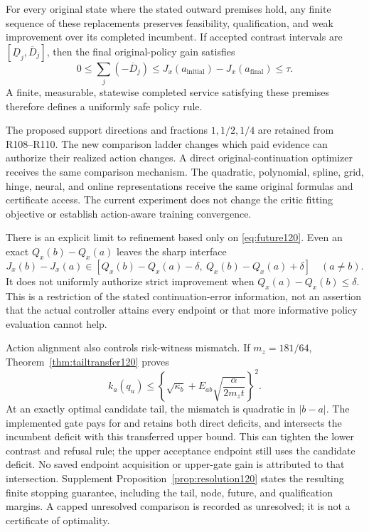 \begin{proposition}
\label{prop:safe120}
For every original state where the stated outward premises hold,
any finite sequence of these replacements preserves feasibility,
qualification, and weak improvement over its completed incumbent.
If accepted contrast intervals are $[\underline D_j,\overline D_j]$,
then the final original-policy gain satisfies
\begin{equation}\label{eq:gainaccount120}
 0\le\sum_j(-\overline D_j)
       \le J_x(a_{\mathrm{initial}})-J_x(a_{\mathrm{final}})
       \le\tau .
\end{equation}
A finite, measurable, statewise completed service satisfying these
premises therefore defines a uniformly safe policy rule.
\end{proposition}

The proposed support directions and fractions $1,1/2,1/4$ are
retained from R108--R110.  The new comparison ladder changes which
paid evidence can authorize their realized action changes.  A direct
original-continuation optimizer receives the same comparison mechanism.
The quadratic, polynomial, spline, grid, hinge, neural, and online
representations receive the same original formulas and certificate
access.  The current experiment does not change the critic fitting
objective or establish action-aware training convergence.

There is an explicit limit to refinement based only on
\eqref{eq:future120}.  Even an exact $Q_x(b)-Q_x(a)$ leaves the
sharp interface
\[
 J_x(b)-J_x(a)\in
 [Q_x(b)-Q_x(a)-\delta,\ Q_x(b)-Q_x(a)+\delta]
 \quad(a\ne b).
\]
It does not uniformly authorize strict improvement when
$Q_x(a)-Q_x(b)\le\delta$.  This is a restriction of the stated
continuation-error information, not an assertion that the actual
controller attains every endpoint or that more informative policy
evaluation cannot help.

Action alignment also controls risk-witness mismatch.  If
$m_z=181/64$, Theorem~\ref{thm:tailtransfer120} proves
\begin{equation}\label{eq:tailtransfer120}
 k_a(q_u)\le
 \left\{\sqrt{\kappa_b}
       +E_{ab}\sqrt{\frac{\alpha}{2m_zt}}\right\}^{\!2}.
\end{equation}
At an exactly optimal candidate tail, the mismatch is quadratic in
$|b-a|$.  The implemented gate pays for and retains both direct
deficits, and intersects the incumbent deficit with this transferred
upper bound.  This can tighten the lower contrast and refusal rule;
the upper acceptance endpoint still uses the candidate deficit.
No saved endpoint acquisition or upper-gate gain is attributed to
that intersection.
Supplement Proposition~\ref{prop:resolution120} states the resulting
finite stopping guarantee, including the tail, node, future, and
qualification margins.  A capped unresolved comparison is recorded
as unresolved; it is not a certificate of optimality.

